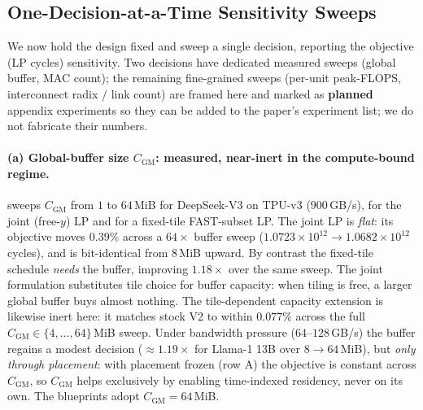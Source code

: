\subsection{One-Decision-at-a-Time Sensitivity Sweeps}
\label{app:deficit:sweeps}

We now hold the design fixed and sweep a single decision, reporting the objective
(LP cycles) sensitivity. Two decisions have dedicated measured sweeps (global
buffer, MAC count); the remaining fine-grained sweeps (per-unit peak-FLOPS,
interconnect radix / link count) are framed here and marked as
\textcolor{orange!85!black}{\textbf{planned}} appendix experiments so they can be
added to the paper's experiment list; we do not fabricate their numbers.

\paragraph{(a) Global-buffer size $C_{\mathrm{GM}}$: measured, near-inert in
the compute-bound regime.}  sweeps $C_{\mathrm{GM}}$ from
$1$ to $64$\,MiB for DeepSeek-V3 on TPU-v3 ($900$\,GB/s), for the joint (free-$y$)
LP and for a fixed-tile FAST-subset LP. The joint LP is \emph{flat}: its objective
moves $0.39\%$ across a $64\times$ buffer sweep ($1.0723\times10^{12}\to
1.0682\times10^{12}$ cycles), and is bit-identical from $8$\,MiB upward. By
contrast the fixed-tile schedule \emph{needs} the buffer, improving $1.18\times$
over the same sweep. The joint formulation substitutes tile choice for buffer
capacity: when tiling is free, a larger global buffer buys almost nothing. The
tile-dependent capacity extension is likewise inert here: it matches stock V2
to within $0.077\%$ across the full $C_{\mathrm{GM}}\in\{4,\dots,64\}$\,MiB sweep.
Under bandwidth pressure ($64$--$128$\,GB/s) the buffer regains a modest decision
($\approx1.19\times$ for Llama-1 13B over $8\to64$\,MiB), but \emph{only through
placement}: with placement frozen (row A) the objective is constant across
$C_{\mathrm{GM}}$, so $C_{\mathrm{GM}}$ helps exclusively by enabling
time-indexed residency, never on its own. The blueprints adopt
$C_{\mathrm{GM}}=64$\,MiB.

